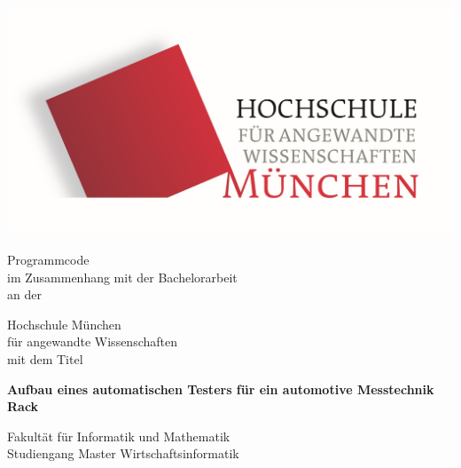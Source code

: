 \thispagestyle{empty}
\begin{center}
	\includegraphics[scale=0.5]{Bilder/HM1_logo.png}


	
	\vspace{1.5cm}
	\huge{Programmcode}\\\vspace{1.5cm}
	\large{im Zusammenhang mit der Bachelorarbeit}\\\vspace{0.5cm}
	\large{an der}\\\vspace{0.5cm}
	
	\huge{Hochschule München}\\
	\normalsize {für angewandte Wissenschaften}\\\vspace{0.5cm}
	\large{mit dem Titel}\\\vspace{1cm}
    \begin{center}
		\Huge{\textbf{Aufbau eines automatischen Testers für ein automotive Messtechnik Rack}}\\[2.0cm]
    \end{center}
    
	
	
	\large{Fakultät für Informatik und Mathematik}\\
	\normalsize {Studiengang Master Wirtschaftsinformatik}\\\vspace{2.1cm}
	
\end{center}

